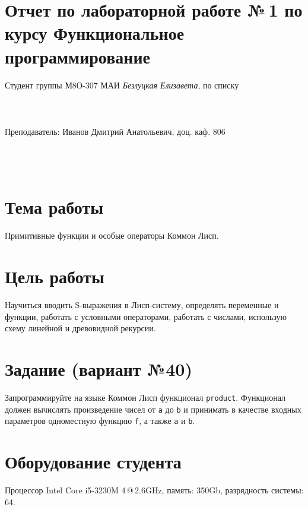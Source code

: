 \documentclass[12pt]{article}
\begin{document}
\section*{Отчет по лабораторной работе №\,1 
по курсу \guillemotleft  Функциональное программирование\guillemotright}
\begin{flushright}
Студент группы М8О-307 МАИ \textit{Безлуцкая Елизавета},  по списку \\
 \\
 \\
\ \\
Преподаватель: Иванов Дмитрий Анатольевич, доц. каф. 806 \\
 \\
 \\
 \\

\end{flushright}

\section{Тема работы}
Примитивные функции и особые операторы Коммон Лисп.

\section{Цель работы}
Научиться вводить S-выражения в Лисп-систему, определять переменные и функции, работать с условными операторами, работать с числами, использую схему линейной и древовидной рекурсии.

\section{Задание (вариант №40)}
Запрограммируйте на языке Коммон Лисп функционал {\tt product}. Функционал должен вычислять произведение чисел от {\tt a} до {\tt b} и принимать в качестве входных параметров одноместную функцию {\tt f}, а также {\tt a} и {\tt b}.

\section{Оборудование студента}
Процессор Intel Core i5-3230M 4\,@\,2.6GHz, память: 350Gb, разрядность системы: 64.
\end{document}
